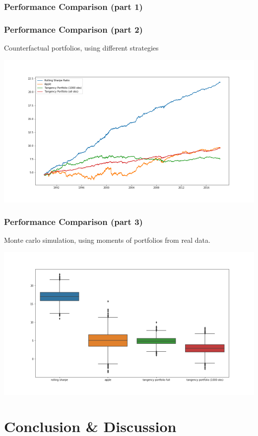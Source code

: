 \documentclass{beamer}
\begin{document}
\begin{frame}
\frametitle{Performance Comparison (part 1)}

\centering
\resizebox{\columnwidth}{!}{%

}

\end{frame}


\begin{frame}
\frametitle{Performance Comparison (part 2)}

Counterfactual portfolios, using different strategies

\centering
\includegraphics[scale=0.32]{../figures/log_investment_experiment.png}

\end{frame}

\begin{frame}
\frametitle{Performance Comparison (part 3)}

Monte carlo simulation, using moments of portfolios from real data.

\centering
\includegraphics[scale=0.32]{../figures/boxplot_monte_carlo.png}

\end{frame}


\section{Conclusion \& Discussion}
\end{document}
